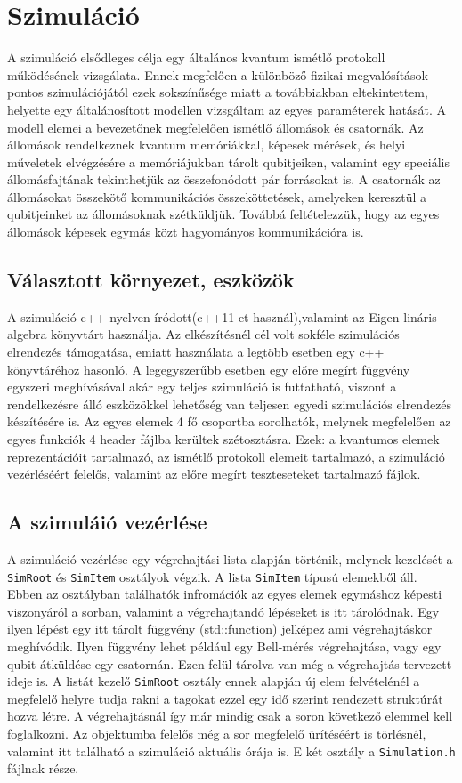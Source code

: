\chapter{Szimuláció}

A szimuláció elsődleges célja egy általános kvantum ismétlő protokoll működésének vizsgálata. Ennek megfelően a különböző fizikai megvalósítások pontos szimulációjától ezek sokszínűsége miatt a továbbiakban eltekintettem, helyette egy általánosított modellen vizsgáltam az egyes paraméterek hatását. A modell elemei a bevezetőnek megfelelően ismétlő állomások és csatornák. Az állomások rendelkeznek kvantum memóriákkal, képesek mérések, és helyi műveletek elvégzésére a memóriájukban tárolt qubitjeiken, valamint egy speciális állomásfajtának tekinthetjük az összefonódott pár forrásokat is. A csatornák az állomásokat összekötő kommunikációs összeköttetések, amelyeken keresztül a qubitjeinket az állomásoknak szétküldjük. Továbbá feltételezzük, hogy az egyes állomások képesek egymás közt hagyományos kommunikációra is. 

\section{Választott környezet, eszközök}

A szimuláció c++ nyelven íródott(c++11-et használ),valamint az Eigen \cite{eigen}  lináris algebra könyvtárt használja. Az elkészítésnél cél volt sokféle szimulációs elrendezés támogatása, emiatt használata a legtöbb esetben egy c++ könyvtáréhoz hasonló. A legegyszerűbb esetben egy előre megírt függvény egyszeri meghívásával akár egy teljes szimuláció is futtatható, viszont a rendelkezésre álló eszközökkel lehetőség van teljesen egyedi szimulációs elrendezés készítésére is. Az egyes elemek 4 fő csoportba sorolhatók, melynek megfelelően az egyes funkciók 4 header fájlba kerültek szétosztásra. Ezek: a kvantumos elemek reprezentációit tartalmazó, az ismétlő protokoll elemeit tartalmazó, a szimuláció vezérléséért felelős, valamint az előre megírt teszteseteket  tartalmazó fájlok.
\section{A szimuláió vezérlése}
A szimuláció vezérlése egy végrehajtási lista alapján történik, melynek kezelését a \texttt{SimRoot} és \texttt{SimItem} osztályok végzik. A lista \texttt{SimItem} típusú elemekből áll. Ebben az osztályban találhatók infromációk az egyes elemek egymáshoz képesti viszonyáról a sorban, valamint a végrehajtandó lépéseket is itt tárolódnak. Egy ilyen lépést egy itt tárolt függvény (std::function) jelképez ami végrehajtáskor meghívódik. Ilyen függvény lehet például egy Bell-mérés végrehajtása, vagy egy qubit átküldése egy csatornán. Ezen felül tárolva van még a végrehajtás tervezett ideje is. A listát kezelő \texttt{SimRoot} osztály ennek alapján új elem felvételénél a megfelelő helyre tudja rakni a tagokat ezzel egy idő szerint rendezett struktúrát hozva létre. A végrehajtásnál így már mindig csak a soron következő  elemmel kell foglalkozni.  Az objektumba felelős még a sor megfelelő ürítéséért is törlésnél, valamint itt található a szimuláció aktuális órája is.
E két osztály a \texttt{Simulation.h} fájlnak része.

